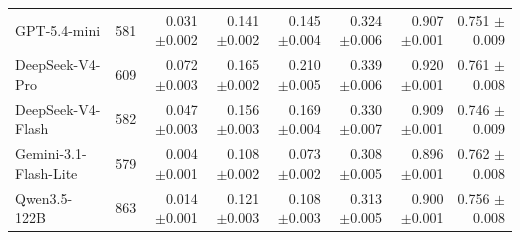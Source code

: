 \begin{table}[t]
\begin{tabular*}{\textwidth}{@{\extracolsep{\fill}}lrrrrrrr@{}}
GPT-5.4-mini & 581 & \shortstack[r]{0.031\\{\scriptsize $\pm$0.002}} & \shortstack[r]{0.141\\{\scriptsize $\pm$0.002}} & \shortstack[r]{0.145\\{\scriptsize $\pm$0.004}} & \shortstack[r]{0.324\\{\scriptsize $\pm$0.006}} & \shortstack[r]{0.907\\{\scriptsize $\pm$0.001}} & \shortstack[r]{0.751\\{\scriptsize $\pm$0.009}} \\
DeepSeek-V4-Pro & 609 & \shortstack[r]{0.072\\{\scriptsize $\pm$0.003}} & \shortstack[r]{0.165\\{\scriptsize $\pm$0.002}} & \shortstack[r]{0.210\\{\scriptsize $\pm$0.005}} & \shortstack[r]{0.339\\{\scriptsize $\pm$0.006}} & \shortstack[r]{0.920\\{\scriptsize $\pm$0.001}} & \shortstack[r]{0.761\\{\scriptsize $\pm$0.008}} \\
DeepSeek-V4-Flash & 582 & \shortstack[r]{0.047\\{\scriptsize $\pm$0.003}} & \shortstack[r]{0.156\\{\scriptsize $\pm$0.003}} & \shortstack[r]{0.169\\{\scriptsize $\pm$0.004}} & \shortstack[r]{0.330\\{\scriptsize $\pm$0.007}} & \shortstack[r]{0.909\\{\scriptsize $\pm$0.001}} & \shortstack[r]{0.746\\{\scriptsize $\pm$0.009}} \\
Gemini-3.1-Flash-Lite & 579 & \shortstack[r]{0.004\\{\scriptsize $\pm$0.001}} & \shortstack[r]{0.108\\{\scriptsize $\pm$0.002}} & \shortstack[r]{0.073\\{\scriptsize $\pm$0.002}} & \shortstack[r]{0.308\\{\scriptsize $\pm$0.005}} & \shortstack[r]{0.896\\{\scriptsize $\pm$0.001}} & \shortstack[r]{0.762\\{\scriptsize $\pm$0.008}} \\
Qwen3.5-122B & 863 & \shortstack[r]{0.014\\{\scriptsize $\pm$0.001}} & \shortstack[r]{0.121\\{\scriptsize $\pm$0.003}} & \shortstack[r]{0.108\\{\scriptsize $\pm$0.003}} & \shortstack[r]{0.313\\{\scriptsize $\pm$0.005}} & \shortstack[r]{0.900\\{\scriptsize $\pm$0.001}} & \shortstack[r]{0.756\\{\scriptsize $\pm$0.008}} \\

\end{tabular*}
\end{table}
